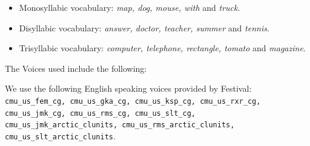 \documentclass{book}
\begin{document}
\begin{appendices}
\begin{itemize}
	\item Monosyllabic vocabulary: \textit{map, dog, mouse, with} and \textit{truck}.
	\item Disyllabic vocabulary: \textit{answer, doctor, teacher, summer}  and \textit{tennis}.
	\item Trisyllabic vocabulary: \textit{computer, telephone, rectangle, tomato} and \textit{magazine}.
\end{itemize}

The Voices used include the following:

We use the following English speaking voices provided by Festival: \texttt{cmu\_us\_fem\_cg, cmu\_us\_gka\_cg, cmu\_us\_ksp\_cg, cmu\_us\_rxr\_cg, cmu\_us\_jmk\_cg, cmu\_us\_rms\_cg, cmu\_us\_slt\_cg, cmu\_us\_jmk\_arctic\_clunits, cmu\_us\_rms\_arctic\_clunits, cmu\_us\_slt\_arctic\_clunits}.





\end{appendices}
\end{document}
